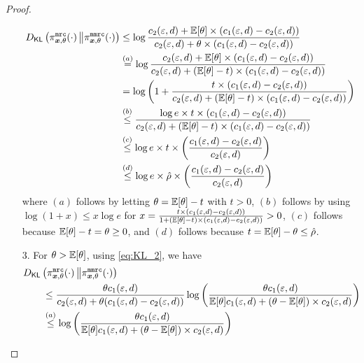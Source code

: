 \begin{proof}
\begin{enumerate}
\begin{align}
{D}_{\mathsf{KL}}\left( \pi^{\texttt{mrc}}_{{\boldsymbol{x}}, \theta}(\cdot)\, \middle\Vert \pi^{\texttt{mmrc}}_{{\boldsymbol{x}}, \theta}(\cdot) \right) & \leq  \log \dfrac{c_2(\varepsilon,d) + \mathbb{E}[\theta] \times (c_1(\varepsilon,d) - c_2(\varepsilon,d))}{c_2(\varepsilon,d) +  \theta \times (c_1(\varepsilon,d) - c_2(\varepsilon,d))} \\
& \stackrel{(a)}{=} \log \dfrac{c_2(\varepsilon,d) + \mathbb{E}[\theta] \times (c_1(\varepsilon,d) - c_2(\varepsilon,d))}{c_2(\varepsilon,d) +  \left(\mathbb{E}[\theta] - t\right) \times (c_1(\varepsilon,d) - c_2(\varepsilon,d))} \\
& = \log \left( 1+ \dfrac{t \times (c_1(\varepsilon,d) - c_2(\varepsilon,d))}{c_2(\varepsilon,d) +  \left(\mathbb{E}[\theta] - t\right) \times (c_1(\varepsilon,d) - c_2(\varepsilon,d))} \right)\\
& \stackrel{(b)}{\leq} \dfrac{\log e \times t \times (c_1(\varepsilon,d) - c_2(\varepsilon,d))}{c_2(\varepsilon,d) +  \left(\mathbb{E}[\theta] - t\right) \times (c_1(\varepsilon,d) - c_2(\varepsilon,d))}\\
& \stackrel{(c)}{\leq} \log e \times t \times \left( \frac{c_1(\varepsilon,d) - c_2(\varepsilon,d)}{c_2(\varepsilon,d)} \right)\\ 
& \stackrel{(d)}{\leq} \log e \times \hat{\rho} \times \left( \frac{c_1(\varepsilon,d) - c_2(\varepsilon,d)}{c_2(\varepsilon,d)} \right) \label{eq:ekl_1}
\end{align}
where $(a)$ follows by letting $\theta = \mathbb{E}[\theta] - t$ with $t > 0$, $(b)$ follows by using $\log (1+x) \leq x \log e$ for $x = \frac{t \times (c_1(\varepsilon,d) - c_2(\varepsilon,d))}{1+ \left(\mathbb{E}[\theta] - t\right) \times (c_1(\varepsilon,d) - c_2(\varepsilon,d))} > 0$, $(c)$ follows because $\mathbb{E}[\theta] - t = \theta \geq 0$, and $(d)$ follows because $t = \mathbb{E}[\theta] - \theta \leq \hat{\rho}$.
\item[3.]
    For $\theta > \mathbb{E}[\theta]$, using \eqref{eq:KL_2}, we have
\begin{align}
& \KLD{\piMRC_{\svbx, \theta}(\cdot)}{\piMMRC_{\svbx, \theta}(\cdot)} \\
& \qquad \leq \dfrac{\theta c_1(\varepsilon,d)}{c_2(\varepsilon,d) +  \theta (c_1(\varepsilon,d) - c_2(\varepsilon,d))} \log \bigg( \dfrac{ \theta c_1(\varepsilon,d)}{\Expectation[\theta] c_1(\varepsilon,d) + (\theta  - \Expectation[\theta] ) \times c_2(\varepsilon,d)} \bigg) \\
&  \qquad \stackrel{(a)}{\leq} \log \bigg( \dfrac{ \theta c_1(\varepsilon,d)}{\Expectation[\theta] c_1(\varepsilon,d) + (\theta  - \Expectation[\theta]) \times c_2(\varepsilon,d)} \bigg) \\

\end{align}
\end{enumerate}
\end{proof}
